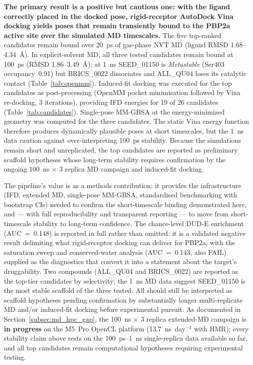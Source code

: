 \documentclass[12pt]{article}
\begin{document}
\textbf{The primary result is a positive but cautious one: with the ligand correctly placed in the docked pose, rigid-receptor AutoDock Vina docking yields poses that remain transiently bound to the PBP2a active site over the simulated MD timescales.} The five top-ranked candidates remain bound over 20~ps of gas-phase NVT MD (ligand RMSD 1.68--4.34~\si{\angstrom}). In explicit-solvent MD, all three tested candidates remain bound at 100~ps (RMSD 1.86--3.49~\si{\angstrom}); at 1~ns SEED\_01150 is \emph{Metastable} (Ser403 occupancy~0.91) but BRICS\_0022 dissociates and ALL\_QU04 loses its catalytic contact (Table~\ref{tab:openmm}). Induced-fit docking was executed for the top candidates as post-processing (OpenMM pocket minimisation followed by Vina re-docking, 3 iterations), providing IFD energies for 19 of 26 candidates (Table~\ref{tab:candidates}). Single-pose MM-GBSA at the energy-minimized geometry was computed for the three candidates. The static Vina energy function therefore produces dynamically plausible poses at short timescales, but the 1~ns data caution against over-interpreting 100~ps stability. Because the simulations remain short and unreplicated, the top candidates are reported as preliminary scaffold hypotheses whose long-term stability requires confirmation by the ongoing 100~ns $\times$ 3 replica MD campaign and induced-fit docking.

The pipeline's value is as a methods contribution: it provides the infrastructure (IFD, extended MD, single-pose MM-GBSA, standardised benchmarking with bootstrap CIs) needed to confirm the short-timescale binding demonstrated here, and --- with full reproducibility and transparent reporting --- to move from short-timescale stability to long-term confidence. The chance-level DUD-E enrichment (AUC~=~0.148) is reported in full rather than omitted: it is a validated negative result delimiting what rigid-receptor docking can deliver for PBP2a, with the saturation sweep and conserved-water analysis (AUC~=~0.143, also FAIL) supplied as the diagnostics that convert it into a statement about the target's druggability. Two compounds (ALL\_QU04 and BRICS\_0022) are reported as the top-tier candidates by selectivity; the 1~ns MD data suggest SEED\_01150 is the most stable scaffold of the three tested. All should still be interpreted as scaffold hypotheses pending confirmation by substantially longer multi-replicate MD and/or induced-fit docking before experimental pursuit. As documented in Section~\ref{subsec:md_hpc_gap}, the 100~ns $\times$ 3 replica extended-MD campaign is {\bf in progress} on the M5~Pro OpenCL platform (13.7~ns~day$^{-1}$ with HMR); every stability claim above rests on the 100~ps--1~ns single-replica data available so far, and all top candidates remain computational hypotheses requiring experimental testing.
\end{document}
